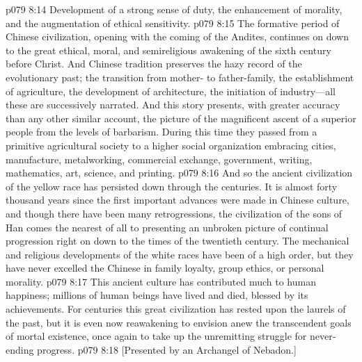 \vs p079 8:14 \bibnobreakspace Development of a strong sense of duty, the enhancement of morality, and the augmentation of ethical sensitivity.
\pc \vs p079 8:15 The formative period of Chinese civilization, opening with the coming of the Andites, continues on down to the great ethical, moral, and semireligious awakening of the sixth century before Christ. And Chinese tradition preserves the hazy record of the evolutionary past; the transition from mother\hyp{} to father\hyp{}family, the establishment of agriculture, the development of architecture, the initiation of industry---all these are successively narrated. And this story presents, with greater accuracy than any other similar account, the picture of the magnificent ascent of a superior people from the levels of barbarism. During this time they passed from a primitive agricultural society to a higher social organization embracing cities, manufacture, metalworking, commercial exchange, government, writing, mathematics, art, science, and printing.
\vs p079 8:16 And so the ancient civilization of the yellow race has persisted down through the centuries. It is almost forty thousand years since the first important advances were made in Chinese culture, and though there have been many retrogressions, the civilization of the sons of Han comes the nearest of all to presenting an unbroken picture of continual progression right on down to the times of the twentieth century. The mechanical and religious developments of the white races have been of a high order, but they have never excelled the Chinese in family loyalty, group ethics, or personal morality.\plusone
\vs p079 8:17 This ancient culture has contributed much to human happiness; millions of human beings have lived and died, blessed by its achievements. For centuries this great civilization has rested upon the laurels of the past, but it is even now reawakening to envision anew the transcendent goals of mortal existence, once again to take up the unremitting struggle for never\hyp{}ending progress.
\vsetoff
\vs p079 8:18 [Presented by an Archangel of Nebadon.]
